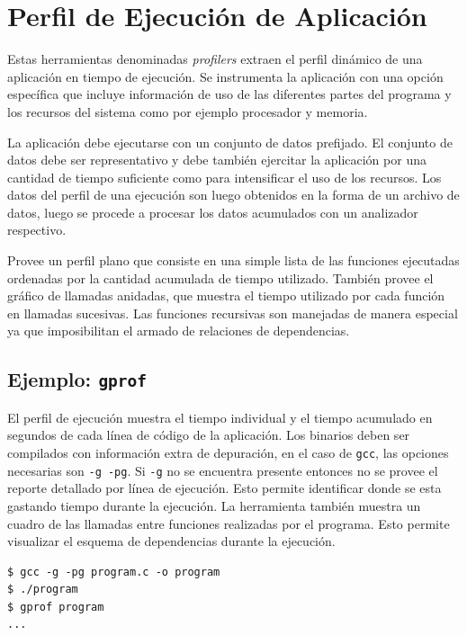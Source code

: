 \documentclass[a4paper]{report}
\begin{document}
\section{Perfil de Ejecución de Aplicación}

Estas herramientas denominadas {\it profilers} extraen el perfil dinámico de una aplicación en tiempo de ejecución. 
Se instrumenta la aplicación con una opción específica que incluye información de uso de las diferentes partes del programa y los recursos del sistema como por ejemplo procesador y memoria.

\bigskip

La aplicación debe ejecutarse con un conjunto de datos prefijado. El conjunto de
datos debe ser representativo y debe también ejercitar la aplicación por
una cantidad de tiempo suficiente como para intensificar el uso de los
recursos. Los datos del perfil de una ejecución son luego obtenidos en la
forma de un archivo de datos, luego se procede a procesar los datos acumulados
con un analizador respectivo.

\bigskip

Provee un perfil plano que consiste en una simple lista de las funciones
ejecutadas ordenadas por la cantidad acumulada de tiempo utilizado.
También provee el gráfico de llamadas anidadas, que muestra el tiempo
utilizado por cada función en llamadas sucesivas. Las funciones recursivas
son manejadas de manera especial ya que imposibilitan el armado de relaciones
de dependencias.

\subsection{Ejemplo: {\tt gprof}}

El perfil de ejecución muestra el tiempo individual y el tiempo acumulado en segundos de cada línea de código de la aplicación. Los binarios deben ser compilados con información extra de depuración, en el caso de {\tt gcc}, las opciones necesarias son {\tt -g -pg}. Si {\tt -g} no se encuentra presente entonces no se provee el reporte detallado por línea de ejecución. Esto permite identificar donde se esta gastando tiempo durante la ejecución.
La herramienta también muestra un cuadro de las llamadas entre funciones realizadas por el programa.
Esto permite visualizar el esquema de dependencias durante la ejecución.

\begin{lstlisting} 
$ gcc -g -pg program.c -o program
$ ./program
$ gprof program
...
\end{lstlisting}
\end{document}
